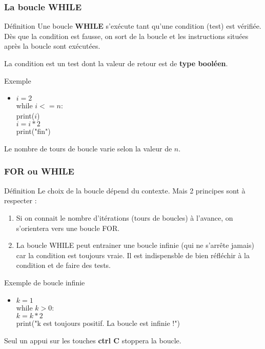 \documentclass[8pt]{beamer}
\newcounter{num}
\begin{document}
\begin{frame}
\frametitle{La boucle WHILE}

\begin{block}{Définition}
Une boucle \textbf{WHILE} s'exécute tant qu'une condition (test) est vérifiée. Dès que la condition est fausse, on sort de la boucle et les instructions situées après la boucle sont exécutées. \medskip

La condition est un test dont la valeur de retour est de \textbf{type booléen}.
\end{block}

\begin{exampleblock}{Exemple}
\begin{itemize}
\item $i=2$\\
while $i <= n$:\\
\hspace{0.5cm}print($i$)\\
\hspace{0.5cm}$i=i*2$\\
print("fin")
\end{itemize}
Le nombre de tours de boucle varie selon la valeur de $n$.
\end{exampleblock}
\end{frame}

\begin{frame}
\frametitle{FOR ou WHILE}

\begin{block}{Définition}
Le choix de la boucle dépend du contexte. Mais 2 principes sont à respecter :
\begin{enumerate}
\item Si on connait le nombre d'itérations (tours de boucles) à l'avance, on s'orientera vers une boucle FOR.
\item La boucle WHILE peut entrainer une boucle infinie (qui ne s'arrête jamais) car la condition est toujours vraie. Il est indispensble de bien réfléchir à la condition et de faire des tests.
\end{enumerate}
\end{block}

\begin{alertblock}{Exemple de boucle infinie}
\begin{itemize}
\item $k=1$\\
while $k>0$:\\
\hspace{0.5cm}$k=k*2$\\
\hspace{0.5cm}print("k est toujours positif. La boucle est infinie !")
\end{itemize}
Seul un appui sur les touches \textbf{ctrl C} stoppera la boucle.
\end{alertblock}
\end{frame}
\end{document}
